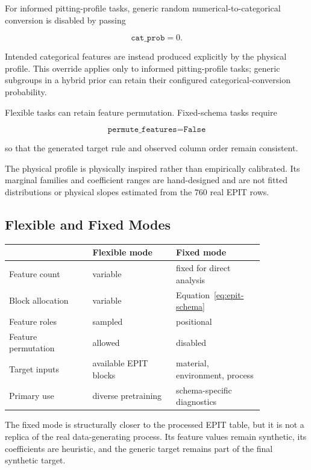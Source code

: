 \documentclass{article}
\begin{document}
For informed pitting-profile tasks, generic random numerical-to-categorical conversion is disabled by passing

\[
\texttt{cat\_prob}=0.
\]

Intended categorical features are instead produced explicitly by the physical profile. This override applies only to informed pitting-profile tasks; generic subgroups in a hybrid prior can retain their configured categorical-conversion probability.

Flexible tasks can retain feature permutation. Fixed-schema tasks require

\[
\texttt{permute\_features}
=
\texttt{False}
\]

so that the generated target rule and observed column order remain consistent.

The physical profile is physically inspired rather than empirically calibrated. Its marginal families and coefficient ranges are hand-designed and are not fitted distributions or physical slopes estimated from the \(760\) real EPIT rows.

\subsection{Flexible and Fixed Modes}

\begin{center}
\small
\begin{tabular}{p{0.28\linewidth}p{0.28\linewidth}p{0.28\linewidth}}
\hline
& \textbf{Flexible mode} & \textbf{Fixed mode} \\
\hline
Feature count & variable & fixed for direct analysis \\
Block allocation & variable & Equation~\eqref{eq:epit-schema} \\
Feature roles & sampled & positional \\
Feature permutation & allowed & disabled \\
Target inputs & available EPIT blocks & material, environment, process \\
Primary use & diverse pretraining & schema-specific diagnostics \\
\hline
\end{tabular}
\end{center}

The fixed mode is structurally closer to the processed EPIT table, but it is not a replica of the real data-generating process. Its feature values remain synthetic, its coefficients are heuristic, and the generic target remains part of the final synthetic target.
\end{document}
